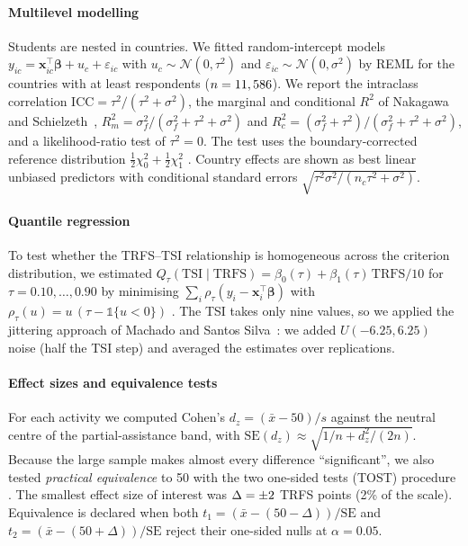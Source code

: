 \documentclass[fleqn,10pt]{wlscirep}
\theoremstyle{remark}
\begin{document}
\paragraph{Multilevel modelling} Students are nested in countries. We fitted random-intercept models $y_{ic}=\mathbf{x}_{ic}^{\top}\boldsymbol\beta+u_c+\varepsilon_{ic}$ with $u_c\sim\mathcal N(0,\tau^2)$ and $\varepsilon_{ic}\sim\mathcal N(0,\sigma^2)$ by REML \cite{raudenbush2002} for the \MlCountries{} countries with at least \MlMinN{} respondents ($n=11,586$). We report the intraclass correlation $\mathrm{ICC}=\tau^2/(\tau^2+\sigma^2)$, the marginal and conditional $R^2$ of Nakagawa and Schielzeth~\cite{nakagawa2013}, $R^2_m=\sigma_f^2/(\sigma_f^2+\tau^2+\sigma^2)$ and $R^2_c=(\sigma_f^2+\tau^2)/(\sigma_f^2+\tau^2+\sigma^2)$, and a likelihood-ratio test of $\tau^2=0$. The test uses the boundary-corrected reference distribution $\tfrac12\chi^2_0+\tfrac12\chi^2_1$ \cite{self1987}. Country effects are shown as best linear unbiased predictors with conditional standard errors $\sqrt{\tau^2\sigma^2/(n_c\tau^2+\sigma^2)}$.

\paragraph{Quantile regression} To test whether the TRFS--TSI relationship is homogeneous across the criterion distribution, we estimated $Q_{\tau}(\mathrm{TSI}\mid\mathrm{TRFS})=\beta_0(\tau)+\beta_1(\tau)\,\mathrm{TRFS}/10$ for $\tau=0.10,\dots,0.90$ by minimising $\sum_i\rho_\tau(y_i-\mathbf{x}_i^{\top}\boldsymbol\beta)$ with $\rho_\tau(u)=u\,(\tau-\mathbb 1\{u<0\})$ \cite{koenker1978}. The TSI takes only nine values, so we applied the jittering approach of Machado and Santos Silva~\cite{machado2005}: we added $U(-6.25,6.25)$ noise (half the TSI step) and averaged the estimates over \QReps{} replications.

\paragraph{Effect sizes and equivalence tests} For each activity we computed Cohen's $d_z=(\bar x-50)/s$ against the neutral centre of the partial-assistance band, with $\mathrm{SE}(d_z)\approx\sqrt{1/n+d_z^2/(2n)}$. Because the large sample makes almost every difference ``significant'', we also tested \emph{practical equivalence} to 50 with the two one-sided tests (TOST) procedure \cite{schuirmann1987,lakens2017}. The smallest effect size of interest was $\Delta=\pm2$ TRFS points (2\% of the scale). Equivalence is declared when both $t_1=(\bar x-(50-\Delta))/\mathrm{SE}$ and $t_2=(\bar x-(50+\Delta))/\mathrm{SE}$ reject their one-sided nulls at $\alpha=0.05$.
\end{document}
